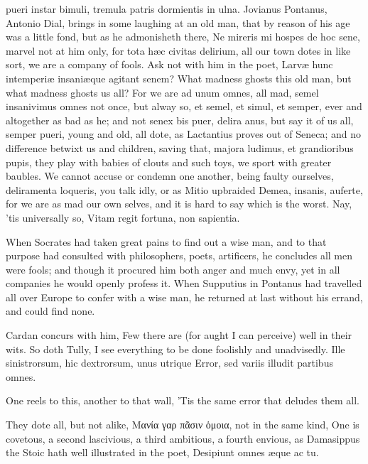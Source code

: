 {pueri instar bimuli, tremula patris dormientis in ulna. Jovianus
Pontanus, Antonio Dial, brings in some laughing at an old man, that by
reason of his age was a little fond, but as he admonisheth there, Ne
mireris mi hospes de hoc sene, marvel not at him only, for tota h\ae{}c
civitas delirium, all our town dotes in like sort, we are a
company of fools. Ask not with him in the poet, Larv\ae{} hunc
intemperi\ae{} insani\ae{}que agitant senem? What madness ghosts this old
man, but what madness ghosts us all? For we are ad unum omnes, all mad,
semel insanivimus omnes not once, but alway so, et semel, et simul, et
semper, ever and altogether as bad as he; and not senex bis puer,
delira anus, but say it of us all, semper pueri, young and old, all
dote, as Lactantius proves out of Seneca; and no difference betwixt us
and children, saving that, majora ludimus, et grandioribus pupis, they
play with babies of clouts and such toys, we sport with greater
baubles. We cannot accuse or condemn one another, being faulty
ourselves, deliramenta loqueris, you talk idly, or as Mitio
upbraided Demea, insanis, auferte, for we are as mad our own selves,
and it is hard to say which is the worst. Nay, 'tis universally so,
Vitam regit fortuna, non sapientia.

When Socrates had taken great pains to find out a wise man, and to
that purpose had consulted with philosophers, poets, artificers, he
concludes all men were fools; and though it procured him both anger and
much envy, yet in all companies he would openly profess it. When 
Supputius in Pontanus had travelled all over Europe to confer with a
wise man, he returned at last without his errand, and could find none.

 Cardan concurs with him, Few there are (for aught I can perceive)
well in their wits. So doth Tully, I see everything to be done
foolishly and unadvisedly.
Ille sinistrorsum, hic dextrorsum, unus utrique
Error, sed variis illudit partibus omnes.

One reels to this, another to that wall,
'Tis the same error that deludes them all.

They dote all, but not alike, Μανία γαρ πᾶσιν ὁμοια, not in the
same kind, One is covetous, a second lascivious, a third ambitious, a
fourth envious, \etc as Damasippus the Stoic hath well illustrated in
the poet,
Desipiunt omnes \ae{}que ac tu.

}
